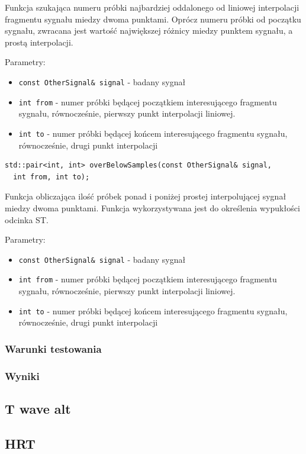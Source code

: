 \documentclass[a4paper, 11pt]{article}
\begin{document}
Funkcja szukająca numeru próbki najbardziej oddalonego od liniowej interpolacji
fragmentu sygnału miedzy dwoma punktami. Oprócz numeru próbki od początku
sygnału, zwracana jest wartość największej różnicy miedzy punktem sygnału, a
prostą interpolacji.

Parametry:
\begin{itemize}
  \item \verb|const OtherSignal& signal| - badany sygnał
  \item \verb|int from| - numer próbki będącej początkiem interesującego
    fragmentu sygnału, równocześnie, pierwszy punkt interpolacji liniowej.
  \item \verb|int to| - numer próbki będącej końcem interesującego fragmentu
    sygnału, równocześnie, drugi punkt interpolacji
\end{itemize}

\begin{lstlisting}
std::pair<int, int> overBelowSamples(const OtherSignal& signal,
  int from, int to);
\end{lstlisting}

Funkcja obliczająca ilość próbek ponad i poniżej prostej interpolującej sygnał
miedzy dwoma punktami. Funkcja wykorzystywana jest do określenia wypukłości
odcinka ST.

Parametry:
\begin{itemize}
  \item \verb|const OtherSignal& signal| - badany sygnał
  \item \verb|int from| - numer próbki będącej początkiem interesującego
    fragmentu sygnału, równocześnie, pierwszy punkt interpolacji liniowej.
  \item \verb|int to| - numer próbki będącej końcem interesującego fragmentu
    sygnału, równocześnie, drugi punkt interpolacji
\end{itemize}

\subsubsection{Warunki testowania}
\label{sec:st_interval:tests}

\subsubsection{Wyniki}
\label{sec:st_interval:results}

\subsection{T wave alt}
\label{sec:t_wave_alt}

\subsection{HRT}
\label{sec:hrt}



\end{document}

